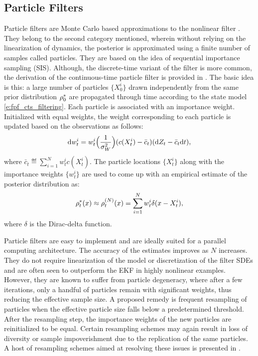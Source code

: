 \subsection{Particle Filters}
\label{e:fpf_particle}
Particle filters are Monte Carlo based approximations to the nonlinear filter \cite{doucet2000sequential}.  They belong to the second category mentioned, wherein without relying on the linearization of dynamics, the posterior is approximated using a finite number of samples called particles. They are based on the idea of sequential importance sampling (SIS). Although, the discrete-time variant of the filter is more common, the derivation of the continuous-time particle filter is provided in \cite{kutsurpfi19}. The basic idea is this: a large number of particles $\{X^i_0\}$ drawn independently from the same prior distribution $\rho^*_0$ are propagated through time according to the state model \eqref{e:fpf_cts_filtering}. Each particle is associated with an importance weight. Initialized with equal weights, the weight corresponding to each particle is updated based on the observations as follows:
\begin{equation}
\ud w^i_t = w^i_t  \Bigl(\frac{1}{\sigma^2_W} \Bigr) (c(X^i_t)  - \bar{c}_t ) (\ud Z_t - \bar{c}_t \ud t),
\label{e:fpf_particle_wt}
\end{equation}
where $\bar{c}_t \eqdef \sum_{i=1}^N w^i_t c(X^i_t)$. The particle locations $\{X^i_t\}$ along with the importance weights $\{w^i_t\}$ are used to come up with an empirical estimate of the posterior distribution as:
\begin{equation}
\pr^*_t(x) \approx \pr^{(N)}_t(x) = \sum_{i=1}^N w^i_t \delta(x -X^i_t),
\label{e:fpf_particle_empirical}
\end{equation}
where $\delta$ is the Dirac-delta function. 

Particle filters are easy to implement and are ideally suited for a parallel computing architecture. The accuracy of the estimates improves as $N$ increases. They do not require linearization of the model or discretization of the filter SDEs and are often seen to outperform the EKF in highly nonlinear examples. However, they are known to suffer from particle degeneracy, where after a few iterations, only a handful of particles remain with significant weights, thus reducing the effective sample size. A proposed remedy is frequent resampling of particles when the effective particle size falls below a predetermined threshold. After the resampling step, the importance weights of the new particles are reinitialized to be equal. Certain resampling schemes may again result in loss of diversity or sample impoverishment due to the replication of the same particles. A host of resampling schemes aimed at resolving these issues is presented in \cite{budchelee07, arumasgorcla02}.
 
